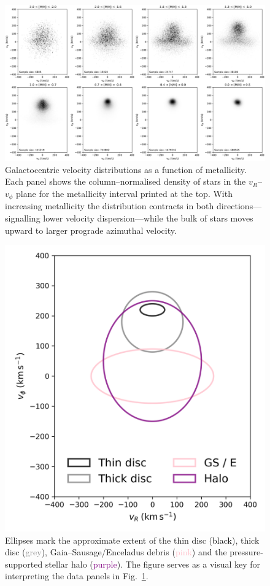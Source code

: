 \documentclass[a4paper,12pt]{article}
\begin{document}
\begin{figure}
  \centering
  \includegraphics[width=\textwidth]
                   {../figures/vphi_metallicity_histograms.png}
  \caption{Galactocentric velocity distributions as a function of metallicity.
           Each panel shows the column–normalised density of stars in the
           $v_R$–$v_\phi$ plane for the metallicity interval printed at the
           top. With increasing metallicity the distribution contracts in both
           directions—signalling lower velocity dispersion—while the bulk
           of stars moves upward to larger prograde azimuthal velocity.
           }
  \label{fig:vRvphi_bins}
\end{figure}


\begin{figure}
  \centering
  \includegraphics[width=0.3\columnwidth]
                   {../figures/reference_velocity_ellipses.png}
  \caption{Ellipses mark the approximate extent of the thin disc
           (\textcolor{black}{black}), thick disc (\textcolor{gray}{grey}),
           Gaia–Sausage/Enceladus debris (\textcolor{pink}{pink}) and the
           pressure-supported stellar halo (\textcolor{purple}{purple}).
           The figure serves as a visual key for interpreting the data panels
           in Fig.~\ref{fig:vRvphi_bins}.}
  \label{fig:ref_ellipses}
\end{figure}
\end{document}
